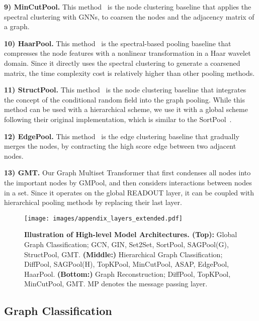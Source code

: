 \documentclass{article} \usepackage{iclr2021_conference,times}
\begin{document}
\textbf{9) MinCutPool.} This method~\citep{MincutPool} is the node clustering baseline that applies the spectral clustering with GNNs, to coarsen the nodes and the adjacency matrix of a graph.

\textbf{10) HaarPool.} This method~\citep{HaarPool} is the spectral-based pooling baseline that compresses the node features with a nonlinear transformation in a Haar wavelet domain. Since it directly uses the spectral clustering to generate a coarsened matrix, the time complexity cost is relatively higher than other pooling methods.

\textbf{11) StructPool.} This method~\citep{StructPool} is the node clustering baseline that integrates the concept of the conditional random field into the graph pooling. While this method can be used with a hierarchical scheme, we use it with a global scheme following their original implementation, which is similar to the SortPool~\citep{SortPool}.

\textbf{12) EdgePool.} This method~\citep{edgepool} is the edge clustering baseline that gradually merges the nodes, by contracting the high score edge between two adjacent nodes. 

\textbf{13) GMT.} Our Graph Multiset Transformer that first condenses all nodes into the important nodes by GMPool, and then considers interactions between nodes in a set. Since it operates on the global READOUT layer, it can be coupled with hierarchical pooling methods by replacing their last layer.

\begin{figure*}[t]
    \centering
    \texttt{[image: images/appendix\_layers\_extended.pdf]}
    \vskip -0.15in
    \caption{\small \textbf{Illustration of High-level Model Architectures. (Top):} Global Graph Classification; GCN, GIN, Set2Set, SortPool, SAGPool(G), StructPool, GMT. \textbf{(Middle:)} Hierarchical Graph Classification; DiffPool, SAGPool(H), TopKPool, MinCutPool, ASAP, EdgePool, HaarPool. \textbf{(Bottom:)} Graph Reconstruction; DiffPool, TopKPool, MinCutPool, GMT. MP denotes the message passing layer.}
    \vskip -0.15in
    \label{fig:appendix/layers}
\end{figure*}

\subsection{Graph Classification}
\end{document}
